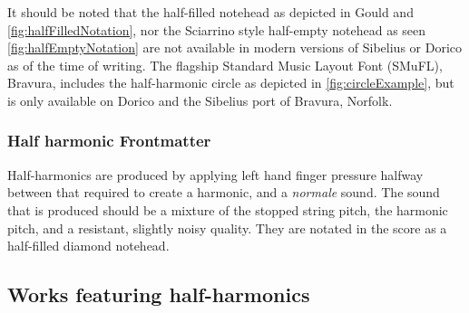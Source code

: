 





It should be noted that the half-filled notehead as depicted in Gould and \autoref{fig:halfFilledNotation}, nor the Sciarrino style half-empty notehead as seen \autoref{fig:halfEmptyNotation} are not available in modern versions of Sibelius or Dorico as of the time of writing.\autocite[424]{gouldBars2011}
The flagship Standard Music Layout Font (SMuFL), Bravura, includes the half-harmonic circle as depicted in \autoref{fig:circleExample}, but is only available on Dorico and the Sibelius port of Bravura, Norfolk.\autocite[]{w3ccommitteeStandardMusicFont2019}

\subsubsection{Half harmonic Frontmatter}\label{sec:halfHarmonicFrontmatter}
Half-harmonics are produced by applying left hand finger pressure halfway between that required to create a harmonic, and a \emph{normale} sound. 
The sound that is produced should be a mixture of the stopped string pitch, the harmonic pitch, and a resistant, slightly noisy quality.
They are notated in the score as a half-filled diamond notehead.
\subsection{Works featuring half-harmonics}\label{sec:half-harmonicsLiterature}

